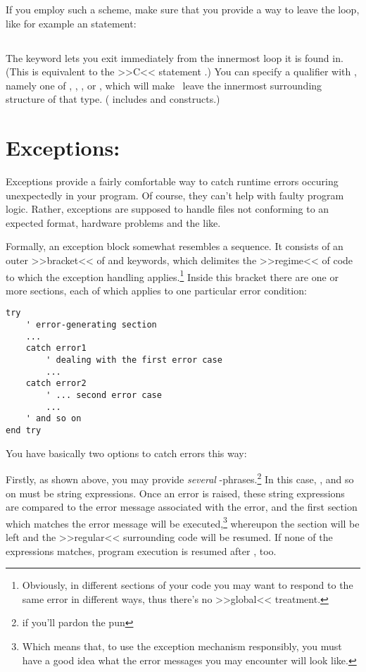 If you employ such a scheme, make sure that you provide a way to leave
the loop, like for example an  statement:

\subsection{}

The keyword  lets you exit immediately from the innermost loop
it is found in. (This is equivalent to the >>C<< statement .)
You can specify a qualifier with , namely one of ,
, , or , which will make \SB\ leave the
innermost surrounding structure of that type. ( includes
 and  constructs.)

\section{Exceptions: }

Exceptions provide a fairly comfortable way to catch runtime errors
 occuring unexpectedly in your program.
Of course, they can't help with faulty program logic. Rather, exceptions
are supposed to handle files not conforming to an expected format,
hardware problems and the like.

Formally, an exception block somewhat resembles a 
sequence. It consists of an outer >>bracket<< of  and  keywords, which delimites the >>regime<< of code to which the
exception handling applies.\footnote{Obviously, in different sections of
your code you may want to respond to the same error in different ways,
thus there's no >>global<< treatment.}
Inside this bracket there are one or more  sections, each of
which applies to one particular error condition:

\begin{lstlisting}
try
	' error-generating section
	...
	catch error1
		' dealing with the first error case
		...
	catch error2
		' ... second error case
		...
	' and so on
end try
\end{lstlisting}

You have basically two options to catch errors this way:

Firstly, as shown above, you may provide \emph{several}
-phrases.\footnote{if you'll pardon the pun} In this case,
,  and so on must be string expressions. Once an
error is raised, these string expressions are compared to the error
message associated with the error, and the first  section
which matches the error message will be executed,\footnote{Which means
that, to use the exception mechanism responsibly, you must have a good
idea what the error messages you may encounter will look like.} whereupon
the  section will be left and the >>regular<<
surrounding code will be resumed. If none of the  expressions
matches, program execution is resumed after , too.

